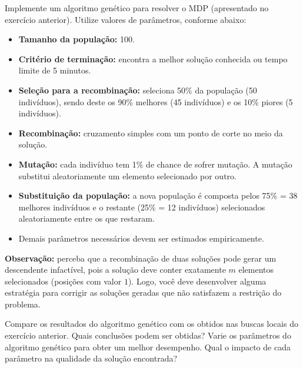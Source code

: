 \begin{exercise}
Implemente um algoritmo genético para resolver o MDP (apresentado no exercício anterior). Utilize valores de parâmetros, conforme abaixo:
\begin{itemize}
	\item \textbf{Tamanho da população:} 100.
	\item \textbf{Critério de terminação:} encontra a melhor solução conhecida ou tempo limite de 5 minutos.
	\item \textbf{Seleção para a recombinação:} seleciona 50\% da população (50 indivíduos), sendo deste os 90\% melhores (45 indivíduos) e os 10\% piores (5 indivíduos).
	\item \textbf{Recombinação:} cruzamento simples com um ponto de corte no meio da solução.
	\item \textbf{Mutação:} cada indivíduo tem 1\% de chance de sofrer mutação. A mutação substitui aleatoriamente um elemento selecionado por outro.
	\item \textbf{Substituição da população:} a nova população é composta pelos 75\% = 38 melhores indivíduos e o restante (25\% = 12 indivíduos) selecionados aleatoriamente entre os que restaram.
	\item Demais parâmetros necessários devem ser estimados empiricamente.
\end{itemize}

\insertspace

\textbf{Observação:} perceba que a recombinação de duas soluções pode gerar um descendente infactível, pois a solução deve conter exatamente $m$ elementos selecionados (posições com valor $1$). Logo, você deve desenvolver alguma estratégia para corrigir as soluções geradas que não satisfazem a restrição do problema.

Compare os resultados do algoritmo genético com os obtidos nas buscas locais do exercício anterior. Quais conclusões podem ser obtidas? Varie os parâmetros do algoritmo genético para obter um melhor desempenho. Qual o impacto de cada parâmetro na qualidade da solução encontrada?

\end{exercise}